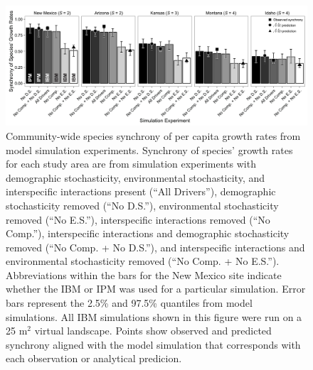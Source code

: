 \documentclass[12pt,]{article}
\begin{document}
\begin{figure}[!ht]
  \centering
      \includegraphics[width=6in]{./components/formatted_figures/formatted_figure1.png}
  \caption{Community-wide species synchrony of per capita growth rates from model simulation experiments. Synchrony of species' growth rates for each study area are from simulation experiments with demographic stochasticity, environmental stochasticity, and interspecific interactions present (``All Drivers''), demographic stochasticity removed (``No D.S.''), environmental stochasticity removed (``No E.S.''), interspecific interactions removed (``No Comp.''), interspecific interactions and demographic stochasticity removed (``No Comp. + No D.S.''), and interspecific interactions and environmental stochasticity removed (``No Comp. + No E.S.''). Abbreviations within the bars for the New Mexico site indicate whether the IBM or IPM was used for a particular simulation. Error bars represent the 2.5\% and 97.5\% quantiles from model simulations. All IBM simulations shown in this figure were run on a 25 $\text{m}^2$ virtual landscape. Points show observed and predicted synchrony aligned with the model simulation that corresponds with each observation or analytical predicion.}
\end{figure}

\pagebreak{}
\end{document}
